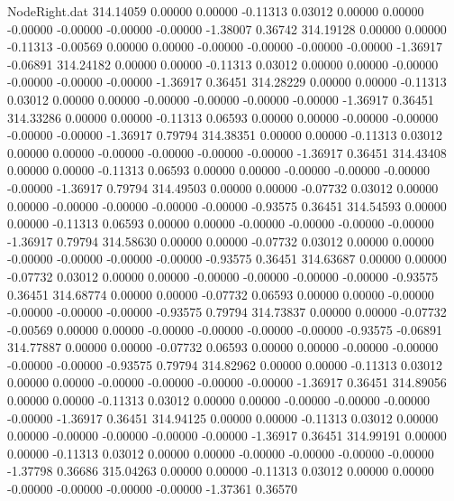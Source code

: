 \begin{filecontents}{NodeRight.dat}
 314.14059    0.00000    0.00000    -0.11313    0.03012    0.00000    0.00000   -0.00000   -0.00000   -0.00000   -0.00000   -1.38007    0.36742
 314.19128    0.00000    0.00000    -0.11313   -0.00569    0.00000    0.00000   -0.00000   -0.00000   -0.00000   -0.00000   -1.36917   -0.06891
 314.24182    0.00000    0.00000    -0.11313    0.03012    0.00000    0.00000   -0.00000   -0.00000   -0.00000   -0.00000   -1.36917    0.36451
 314.28229    0.00000    0.00000    -0.11313    0.03012    0.00000    0.00000   -0.00000   -0.00000   -0.00000   -0.00000   -1.36917    0.36451
 314.33286    0.00000    0.00000    -0.11313    0.06593    0.00000    0.00000   -0.00000   -0.00000   -0.00000   -0.00000   -1.36917    0.79794
 314.38351    0.00000    0.00000    -0.11313    0.03012    0.00000    0.00000   -0.00000   -0.00000   -0.00000   -0.00000   -1.36917    0.36451
 314.43408    0.00000    0.00000    -0.11313    0.06593    0.00000    0.00000   -0.00000   -0.00000   -0.00000   -0.00000   -1.36917    0.79794
 314.49503    0.00000    0.00000    -0.07732    0.03012    0.00000    0.00000   -0.00000   -0.00000   -0.00000   -0.00000   -0.93575    0.36451
 314.54593    0.00000    0.00000    -0.11313    0.06593    0.00000    0.00000   -0.00000   -0.00000   -0.00000   -0.00000   -1.36917    0.79794
 314.58630    0.00000    0.00000    -0.07732    0.03012    0.00000    0.00000   -0.00000   -0.00000   -0.00000   -0.00000   -0.93575    0.36451
 314.63687    0.00000    0.00000    -0.07732    0.03012    0.00000    0.00000   -0.00000   -0.00000   -0.00000   -0.00000   -0.93575    0.36451
 314.68774    0.00000    0.00000    -0.07732    0.06593    0.00000    0.00000   -0.00000   -0.00000   -0.00000   -0.00000   -0.93575    0.79794
 314.73837    0.00000    0.00000    -0.07732   -0.00569    0.00000    0.00000   -0.00000   -0.00000   -0.00000   -0.00000   -0.93575   -0.06891
 314.77887    0.00000    0.00000    -0.07732    0.06593    0.00000    0.00000   -0.00000   -0.00000   -0.00000   -0.00000   -0.93575    0.79794
 314.82962    0.00000    0.00000    -0.11313    0.03012    0.00000    0.00000   -0.00000   -0.00000   -0.00000   -0.00000   -1.36917    0.36451
 314.89056    0.00000    0.00000    -0.11313    0.03012    0.00000    0.00000   -0.00000   -0.00000   -0.00000   -0.00000   -1.36917    0.36451
 314.94125    0.00000    0.00000    -0.11313    0.03012    0.00000    0.00000   -0.00000   -0.00000   -0.00000   -0.00000   -1.36917    0.36451
 314.99191    0.00000    0.00000    -0.11313    0.03012    0.00000    0.00000   -0.00000   -0.00000   -0.00000   -0.00000   -1.37798    0.36686
 315.04263    0.00000    0.00000    -0.11313    0.03012    0.00000    0.00000   -0.00000   -0.00000   -0.00000   -0.00000   -1.37361    0.36570

\end{filecontents}
